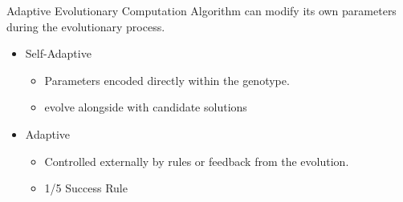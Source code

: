     \begin{frame}{Adaptive Evolutionary Computation}
        Algorithm can modify its own parameters during the evolutionary process.\\
        \vspace{10pt}
        \begin{itemize}
            \item Self-Adaptive 
                \begin{itemize}
                    \item Parameters encoded directly within the genotype.
                    \item evolve alongside with candidate solutions
                \end{itemize}
            \item Adaptive
                \begin{itemize}
                    \item Controlled externally by rules or feedback from the evolution.
                    \item 1/5 Success Rule
                \end{itemize}
        \end{itemize}
    \end{frame}
